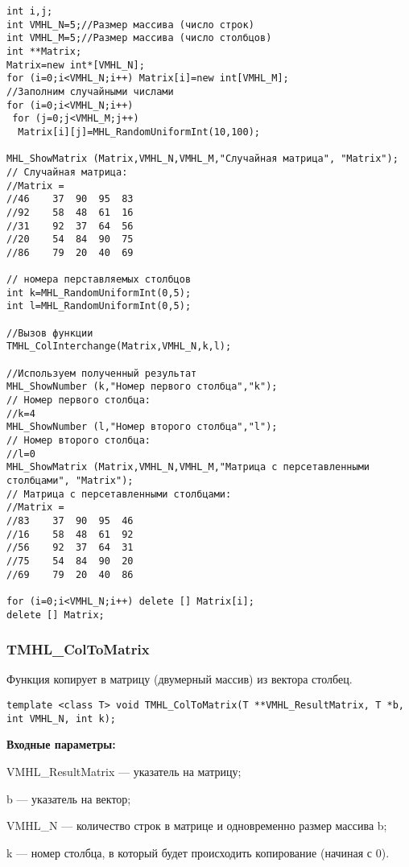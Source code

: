 \documentclass[a4paper,12pt]{article}
\begin{document}
\begin{lstlisting}[label=code_use_TMHL_ColInterchange,caption=Пример использования]
int i,j;
int VMHL_N=5;//Размер массива (число строк)
int VMHL_M=5;//Размер массива (число столбцов)
int **Matrix;
Matrix=new int*[VMHL_N];
for (i=0;i<VMHL_N;i++) Matrix[i]=new int[VMHL_M];
//Заполним случайными числами
for (i=0;i<VMHL_N;i++)
 for (j=0;j<VMHL_M;j++)
  Matrix[i][j]=MHL_RandomUniformInt(10,100);

MHL_ShowMatrix (Matrix,VMHL_N,VMHL_M,"Случайная матрица", "Matrix");
// Случайная матрица:
//Matrix =	
//46	37	90	95	83
//92	58	48	61	16
//31	92	37	64	56
//20	54	84	90	75
//86	79	20	40	69

// номера перставляемых столбцов
int k=MHL_RandomUniformInt(0,5);
int l=MHL_RandomUniformInt(0,5);

//Вызов функции
TMHL_ColInterchange(Matrix,VMHL_N,k,l);

//Используем полученный результат
MHL_ShowNumber (k,"Номер первого столбца","k");
// Номер первого столбца:
//k=4
MHL_ShowNumber (l,"Номер второго столбца","l");
// Номер второго столбца:
//l=0
MHL_ShowMatrix (Matrix,VMHL_N,VMHL_M,"Матрица с персетавленными столбцами", "Matrix");
// Матрица с персетавленными столбцами:
//Matrix =	
//83	37	90	95	46
//16	58	48	61	92
//56	92	37	64	31
//75	54	84	90	20
//69	79	20	40	86

for (i=0;i<VMHL_N;i++) delete [] Matrix[i];
delete [] Matrix;
\end{lstlisting}

\subsubsection{TMHL\_ColToMatrix}\label{TMHL_ColToMatrix}

Функция копирует в матрицу (двумерный массив) из вектора столбец.


\begin{lstlisting}[label=code_syntax_TMHL_ColToMatrix,caption=Синтаксис]
template <class T> void TMHL_ColToMatrix(T **VMHL_ResultMatrix, T *b, int VMHL_N, int k);
\end{lstlisting}

\textbf{Входные параметры:}  
 
VMHL\_ResultMatrix --- указатель на матрицу;
 
b --- указатель на вектор;
 
VMHL\_N --- количество строк в матрице и одновременно размер массива b;
 
k --- номер столбца, в который будет происходить копирование (начиная с 0).
\end{document}

